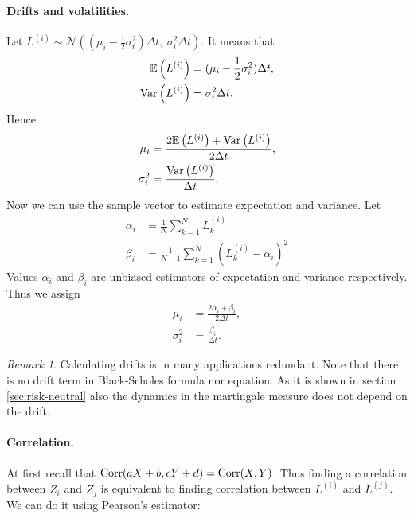 \documentclass[a4paper,11pt, twoside]{book}
\theoremstyle{definition}
\theoremstyle{remark}
\newtheorem{remark}{Remark}[chapter]
\def\Var{{\rm Var}}
\def\E{{\mathbb{E}}}
\def\Corr{{\hbox{Corr}}}
\begin{document}
\paragraph{Drifts and volatilities.}
Let $L^{(i)} \sim \mathcal{N}\left(  (\mu_i - \frac{1}{2}\sigma_i^2)\Delta t,\ \sigma_i^2 \Delta t \right)$. It means that
\begin{equation*}
 \begin{split}
  \E\left( L^{(i)} \right) &= (\mu_i - \frac{1}{2}\sigma_i^2)\Delta t, \\
  \Var\left( L^{(i)} \right) &= \sigma_i^2 \Delta t.
 \end{split}
\end{equation*}
Hence
\begin{equation*}
 \begin{split}
  \mu_i  &= \frac{ 2\E\left( L^{(i)} \right) + \Var\left( L^{(i)} \right) }{2\Delta t}, \\
  \sigma_i^2 &= \frac{\Var\left( L^{(i)} \right)}{\Delta t}.
 \end{split}
\end{equation*}
Now we can use the sample vector to estimate expectation and variance. Let
\begin{equation*}
 \begin{split}
  \alpha_i &= \frac{1}{N}\sum\limits_{k=1}^{N} L^{(i)}_k\\
  \beta_i &= \frac{1}{N-1}\sum\limits_{k=1}^{N}(L^{(i)}_k - \alpha_i)^2
 \end{split}
\end{equation*}
Values $\alpha_i$ and $\beta_i$ are unbiased estimators of expectation and variance respectively. Thus we assign
\begin{equation*}
 \begin{split}
  \mu_i  &= \frac{ 2\alpha_i + \beta_i }{2\Delta t}, \\
  \sigma_i^2 &= \frac{\beta_i}{\Delta t}.
 \end{split}
\end{equation*}
\begin{remark}
 Calculating drifts is in many applications redundant. Note that there is no drift term in Black-Scholes formula nor equation. As it is shown in section \ref{sec:risk-neutral} also the dynamics in the martingale measure does not depend on the drift.
\end{remark}


\paragraph{Correlation.} At first recall that $\Corr(aX + b, cY + d) = \Corr(X,Y)$. Thus finding a correlation between $Z_i$ and $Z_j$ is equivalent to finding correlation between $L^{(i)}$ and $L^{(j)}$. We can do it using Pearson's estimator:
\end{document}
